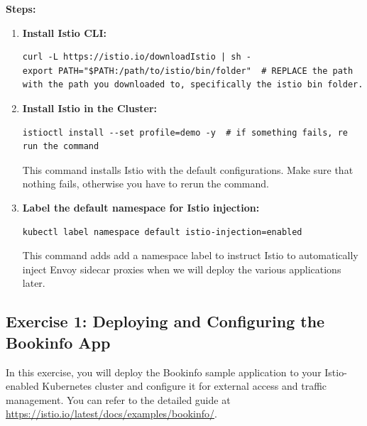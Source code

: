 \documentclass{article}
\begin{document}
\textbf{Steps:}
\begin{enumerate}
    \item \textbf{Install Istio CLI:}
    \begin{lstlisting}
curl -L https://istio.io/downloadIstio | sh -
export PATH="$PATH:/path/to/istio/bin/folder"  # REPLACE the path with the path you downloaded to, specifically the istio bin folder.
    \end{lstlisting}

    \item \textbf{Install Istio in the Cluster:}
    \begin{lstlisting}
istioctl install --set profile=demo -y  # if something fails, re run the command
    \end{lstlisting}
    This command installs Istio with the default configurations. Make sure that nothing fails, otherwise you have to rerun the command.

    \item \textbf{Label the default namespace for Istio injection:}
    \begin{lstlisting}
kubectl label namespace default istio-injection=enabled
    \end{lstlisting}
    This command adds add a namespace label to instruct Istio to automatically inject Envoy sidecar proxies when we will deploy the various applications later.
\end{enumerate}

\subsection{Exercise 1: Deploying and Configuring the Bookinfo App}

In this exercise, you will deploy the Bookinfo sample application to your Istio-enabled Kubernetes cluster and configure it for external access and traffic management. You can refer to the detailed guide at \footnotesize\url{https://istio.io/latest/docs/examples/bookinfo/}. \\
\end{document}
